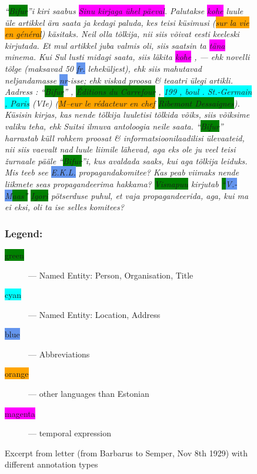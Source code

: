 \documentclass[runningheads]{llncs}
\begin{document}
\begin{figure}
  \centering
  \begin{minipage}{0.8\textwidth}
\itshape
  ``\colorbox{Green}{Bifur}''i kiri saabus \colorbox{Magenta}{Sinu kirjaga \"uhel p\"aeval}. Palutakse \colorbox{Magenta}{kohe} luule \"ule artikkel \"ara saata ja kedagi paluda, kes teisi k\"usimusi
  (\colorbox{Orange}{sur la vie en g\'en\'eral})
käsitaks. Neil olla t\~olkija, nii siis v\~oivat eesti keeleski kirjutada. Et mul artikkel juba valmis oli, siis saatsin ta \colorbox{Magenta}{t\"ana} minema. Kui Sul lusti midagi saata, siis l\"akita \colorbox{Magenta}{kohe} , --- ehk novelli t\~olge (maksavad 50 \colorbox{CornflowerBlue}{fr.} lehek\"uljest), ehk siis mahutavad neljandamasse \colorbox{CornflowerBlue}{nr}-isse; ehk viskad proosa \& teaatri \"ulegi artikli. Aadress : ``\colorbox{Green}{Bifur}'' , \colorbox{Green}{\'Editions du Carrefour} , \colorbox{Cyan}{199 , boul . St.-Germain , Paris} (VIe) (\colorbox{Orange}{M–eur le r\'edacteur en chef}  \colorbox{Green}{Ribemont Dessaignes}). K\"usisin kirjas, kas nende t\~olkija luuletisi t\~olkida v\~oiks, siis v\~oiksime valiku teha, ehk Suitsi ilmuva antoloogia neile saata. ``\colorbox{Green}{Bifur}'' harrastab k\"ull rohkem proosat \& informatsioonilaadilisi \"ulevaateid, nii siis vaevalt nad luule liimile l\"ahevad, aga eks ole ju veel teisi \v{z}urnaale p\"a\"ale ``\colorbox{Green}{Bifur}''i, kus avaldada saaks, kui aga t\~olkija leiduks. Mis teeb see \colorbox{CornflowerBlue}{E.K.L.} propagandakomitee? Kas peab viimaks nende liikmete seas propagandeerima hakkama? \colorbox{Green}{Visnapuu} kirjutab \colorbox{Green}{``\colorbox{CornflowerBlue}{V.-M}aas''} \colorbox{Green}{Igori} p\"otserduse puhul, et vaja propagandeerida, aga, kui ma ei eksi, oli ta ise selles komitees?

  \end{minipage}
  
  \begin{minipage}{\textwidth}
    \vspace{18pt}
    \subsubsection{Legend:}
    \begin{description}
\item[\colorbox{Green}{green}] --- Named Entity: Person, Organisation, Title
\item[\colorbox{Cyan}{cyan}] --- Named Entity: Location, Address
\item[\colorbox{CornflowerBlue}{blue}] --- Abbreviations
\item[\colorbox{Orange}{orange}] --- other languages than Estonian
\item[\colorbox{Magenta}{magenta}] --- temporal expression
\end{description}
    \end{minipage}
  \caption{Excerpt from letter (from Barbarus to Semper, Nov 8th 1929) with different annotation types}\label{fig1}
\end{figure}
\end{document}
